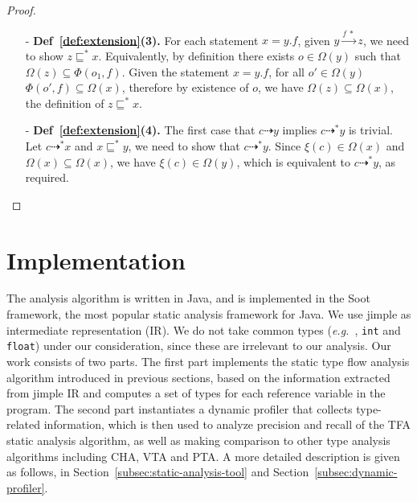 \documentclass{fac}
\newcommand\eg{\textit{e.g.\ }}
\newcommand{\VPT}{\Omega}
\newcommand{\HPT}{\Phi}
\newcommand{\less}{\sqsubseteq}
\newcommand{\tflow}{\dashrightarrow}
\newcommand{\hflow}{\longrightarrow}
\newcommand{\lhflow}[1]{\stackrel{#1}{\hflow}}
\begin{document}
\begin{proof}
\begin{itemize}
\item[-] \textbf{Def~\ref{def:extension}(3).} For each statement $x = y.f$, given $y\lhflow{f\ *}z$, we need to show $z\less^* x$. Equivalently, by definition there exists $o\in\VPT(y)$ such that $\VPT(z)\subseteq\HPT(o_1,f)$. Given the statement $x = y.f$, for all $o'\in \VPT(y)$ $\HPT(o',f)\subseteq\VPT(x)$, therefore by existence of $o$, we have $\VPT(z)\subseteq\VPT(x)$, the definition of $z\less^* x$.
\item[-] \textbf{Def~\ref{def:extension}(4).} The first case that $c\tflow y$ implies $c\tflow^* y$ is trivial. Let $c\tflow^* x$ and $x\less^*y$, we need to show that $c\tflow^*y$. Since $\xi(c)\in\VPT(x)$ and $\VPT(x)\subseteq\VPT(x)$, we have $\xi(c)\in\VPT(y)$, which is equivalent to $c\tflow^*y$, as required.
\end{itemize}
\end{proof}


\section{Implementation}\label{sec:implementation}
The analysis algorithm is written in Java, and is implemented in the Soot framework, the most popular static analysis framework for Java. We use jimple as intermediate representation (IR).
We do not take common types (\eg, \texttt{int} and \texttt{float}) under our consideration, since these are irrelevant to our analysis.
Our work consists of two parts. The first part implements the static type flow analysis algorithm introduced in previous sections, based on the information extracted from jimple IR and computes a set of types for each reference variable in the program. The second part instantiates a dynamic profiler that collects type-related information, which is then used to analyze precision and recall of the TFA static analysis algorithm, as well as making comparison to other type analysis algorithms including CHA, VTA and PTA. A more detailed description is given as follows, in Section~\ref{subsec:static-analysis-tool} and Section~\ref{subsec:dynamic-profiler}.


\end{document}
